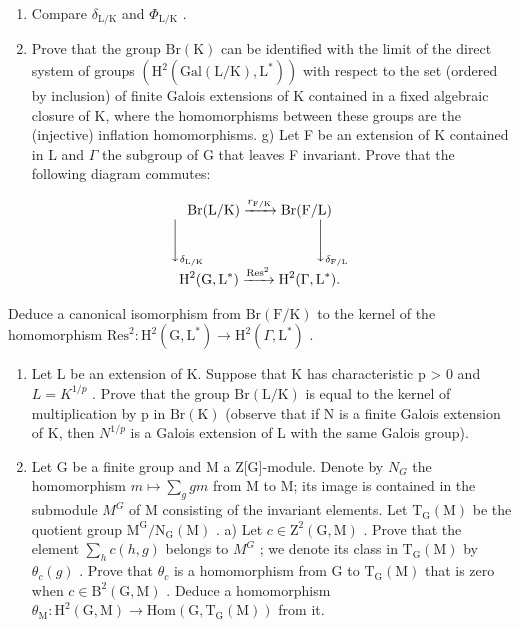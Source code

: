 \begin{enumerate}
\item
  Compare \(\delta_{\mathrm{L / K}}\) and \(\Phi_{\mathrm{L / K}}\) .
\item
  Prove that the group \(\mathrm{Br}(\mathrm{K})\) can be identified with the limit of the direct system of groups \(\left(\mathrm{H}^{2}(\mathrm{Gal}(\mathrm{L}/\mathrm{K}),\mathrm{L}^{*})\right)\) with respect to the set (ordered by inclusion) of finite Galois extensions of K contained in a fixed algebraic closure of K, where the homomorphisms between these groups are the (injective) inflation homomorphisms. g) Let F be an extension of K contained in L and \(\Gamma\) the subgroup of G that leaves F invariant. Prove that the following diagram commutes:
\end{enumerate}

\[
\begin{array}{c} \operatorname{Br} (\mathrm{L} / \mathrm{K}) \xrightarrow {r _ {\mathrm{F} / \mathrm{K}}} \operatorname{Br} (\mathrm{F} / \mathrm{L}) \\ \Biggl \downarrow_ {\delta_ {\mathrm{L} / \mathrm{K}}} \qquad \qquad \qquad \qquad \Biggl \downarrow_ {\delta_ {\mathrm{F} / \mathrm{L}}} \\ \operatorname{H} ^ {2} (\operatorname{G}, \operatorname{L} ^ {*}) \xrightarrow {\operatorname{Res} ^ {2}} \operatorname{H} ^ {2} (\Gamma , \operatorname{L} ^ {*}). \end{array}
\]

Deduce a canonical isomorphism from \(\mathrm{Br}(\mathrm{F}/\mathrm{K})\) to the kernel of the homomorphism \(\mathrm{Res}^{2}:\mathrm{H}^{2}(\mathrm{G},\mathrm{L}^{*})\to\mathrm{H}^{2}(\Gamma,\mathrm{L}^{*})\) .

\begin{enumerate}
\def\labelenumi{\arabic{enumi})}
\setcounter{enumi}{7}
\item
  Let L be an extension of K. Suppose that K has characteristic p \textgreater{} 0 and \(L = K^{1/p}\) . Prove that the group \(\mathrm{Br}(\mathrm{L}/\mathrm{K})\) is equal to the kernel of multiplication by p in \(\mathrm{Br}(\mathrm{K})\) (observe that if N is a finite Galois extension of K, then \(N^{1/p}\) is a Galois extension of L with the same Galois group).
\item
  Let G be a finite group and M a Z{[}G{]}-module. Denote by \(N_{G}\) the homomorphism \(m \mapsto \sum_{g} gm\) from M to M; its image is contained in the submodule \(M^{G}\) of M consisting of the invariant elements. Let \(\mathrm{T}_{\mathrm{G}}(\mathrm{M})\) be the quotient group \(\mathrm{M}^{\mathrm{G}}/\mathrm{N}_{\mathrm{G}}(\mathrm{M})\) . a) Let \(c \in \mathrm{Z}^{2}(\mathrm{G}, \mathrm{M})\) . Prove that the element \(\sum_{h} c(h, g)\) belongs to \(M^{G}\) ; we denote its class in \(\mathrm{T}_{\mathrm{G}}(\mathrm{M})\) by \(\theta_{c}(g)\) . Prove that \(\theta_{c}\) is a homomorphism from G to \(\mathrm{T}_{\mathrm{G}}(\mathrm{M})\) that is zero when \(c \in \mathrm{B}^{2}(\mathrm{G}, \mathrm{M})\) . Deduce a homomorphism \(\theta_{\mathrm{M}} : \mathrm{H}^{2}(\mathrm{G}, \mathrm{M}) \to \mathrm{Hom}(\mathrm{G}, \mathrm{T}_{\mathrm{G}}(\mathrm{M}))\) from it.
\end{enumerate}

